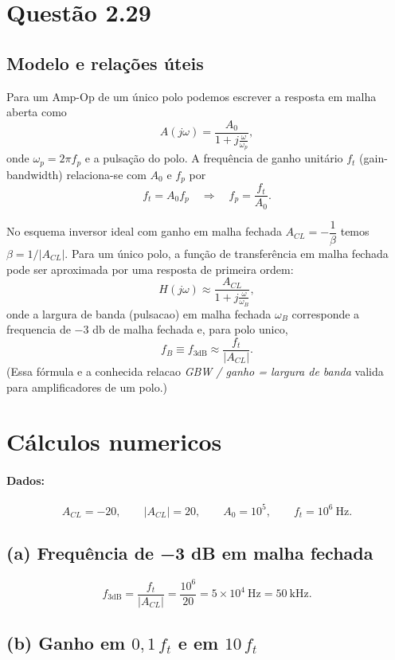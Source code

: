 \section*{Questão 2.29}


\subsection*{Modelo e relações úteis}

Para um Amp-Op de um único polo podemos escrever a resposta em malha aberta como
\[
A(j\omega)=\frac{A_0}{1+j\frac{\omega}{\omega_p}},
\]
onde $\omega_p=2\pi f_p$ e a pulsação do polo. A frequência de ganho unitário $f_t$ (gain-bandwidth) relaciona-se com $A_0$ e $f_p$ por
\[
f_t = A_0 f_p \quad\Longrightarrow\quad f_p=\frac{f_t}{A_0}.
\]

No esquema inversor ideal com ganho em malha fechada $A_{CL}=-\dfrac{1}{\beta}$ temos $\beta = 1/|A_{CL}|$. Para um único polo, a função de transferência em malha fechada pode ser aproximada por uma resposta de primeira ordem:
\[
H(j\omega)\approx \frac{A_{CL}}{1 + j\frac{\omega}{\omega_B}},
\]
onde a largura de banda (pulsacao) em malha fechada $\omega_B$ corresponde a frequencia de −3 db de malha fechada e, para polo unico,
\[
f_B \equiv f_{3\text{dB}} \approx \frac{f_t}{|A_{CL}|}.
\]
(Essa fórmula e a conhecida relacao \emph{GBW / ganho = largura de banda} valida para amplificadores de um polo.)

\section*{Cálculos numericos}

\paragraph{Dados:}
\[
A_{CL} = -20,\qquad |A_{CL}|=20,\qquad A_0=10^5,\qquad f_t=10^6\ \mathrm{Hz}.
\]

\subsection*{(a) Frequência de −3 dB em malha fechada}
\[
f_{3\text{dB}} = \frac{f_t}{|A_{CL}|} = \frac{10^{6}}{20} = 5\times 10^{4}\ \mathrm{Hz}=50\ \text{kHz}.
\]

\subsection*{(b) Ganho em $0{,}1\,f_t$ e em $10\,f_t$}

